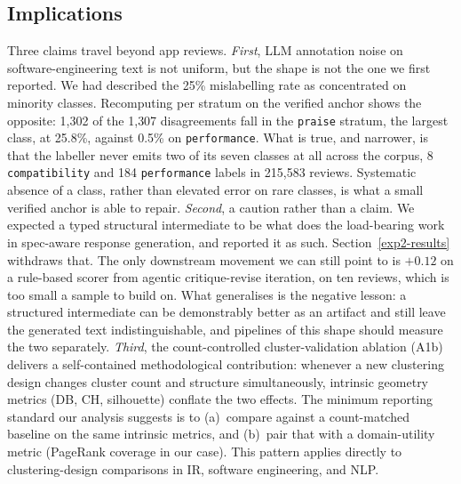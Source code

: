 \documentclass[preprint,12pt]{elsarticle}
\begin{document}
\subsection{Implications}
Three claims travel beyond app reviews. \emph{First}, LLM annotation noise on
  software-engineering text is not uniform, but the shape is not the one we first reported. We
  had described the 25\% mislabelling rate as concentrated on minority classes. Recomputing per
  stratum on the verified anchor shows the opposite: 1{,}302 of the 1{,}307 disagreements fall in
  the \texttt{praise} stratum, the largest class, at 25.8\%, against 0.5\% on
  \texttt{performance}. What is true, and narrower, is that the labeller never emits two of its
  seven classes at all across the corpus, 8 \texttt{compatibility} and 184 \texttt{performance}
  labels in 215{,}583 reviews. Systematic absence of a class, rather than elevated error on rare
  classes, is what a small verified anchor is able to repair. \emph{Second}, a caution rather than a claim. We expected a typed structural intermediate to be
  what does the load-bearing work in spec-aware response generation, and reported it as such.
  Section~\ref{exp2-results} withdraws that. The only downstream movement we can still point to
  is $+0.12$ on a rule-based scorer from agentic critique-revise iteration, on ten reviews, which
  is too small a sample to build on. What generalises is the negative lesson: a structured
  intermediate can be demonstrably better as an artifact and still leave the generated text
  indistinguishable, and pipelines of this shape should measure the two separately. \emph{Third}, the count-controlled
  cluster-validation ablation (A1b) delivers a self-contained methodological contribution:
  whenever a new clustering design changes cluster count and structure simultaneously, intrinsic
   geometry metrics (DB, CH, silhouette) conflate the two effects. The minimum reporting
  standard our analysis suggests is to (a)~compare against a count-matched baseline on the same
  intrinsic metrics, and (b)~pair that with a domain-utility metric (PageRank coverage in our
  case). This pattern applies directly to clustering-design comparisons in IR, software
  engineering, and NLP.
\end{document}
